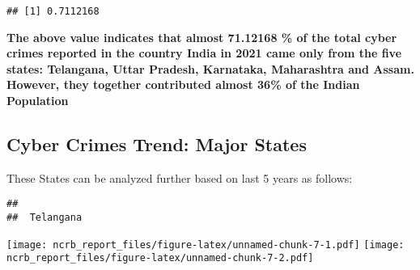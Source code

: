 \documentclass[
  12,
  a4paper,
]{report}
\newenvironment{Shaded}{\begin{snugshade}}{\end{snugshade}}
\newcommand{\ControlFlowTok}[1]{\textcolor[rgb]{0.13,0.29,0.53}{\textbf{#1}}}
\newcommand{\DecValTok}[1]{\textcolor[rgb]{0.00,0.00,0.81}{#1}}
\newcommand{\FunctionTok}[1]{\textcolor[rgb]{0.13,0.29,0.53}{\textbf{#1}}}
\newcommand{\NormalTok}[1]{#1}
\newcommand{\OtherTok}[1]{\textcolor[rgb]{0.56,0.35,0.01}{#1}}
\newcommand{\SpecialCharTok}[1]{\textcolor[rgb]{0.81,0.36,0.00}{\textbf{#1}}}
\newcommand{\StringTok}[1]{\textcolor[rgb]{0.31,0.60,0.02}{#1}}
\begin{document}
\begin{verbatim}
## [1] 0.7112168
\end{verbatim}

\textbf{The above value indicates that almost 71.12168 \% of the total
cyber crimes reported in the country India in 2021 came only from the
five states: Telangana, Uttar Pradesh, Karnataka, Maharashtra and Assam.
However, they together contributed almost 36\% of the Indian Population}

\hypertarget{cyber-crimes-trend-major-states}{%
\subsection{Cyber Crimes Trend: Major
States}\label{cyber-crimes-trend-major-states}}

These States can be analyzed further based on last 5 years as follows:

\begin{Shaded}
\end{Shaded}

\begin{verbatim}
## 
##  Telangana
\end{verbatim}

\texttt{[image: ncrb\_report\_files/figure-latex/unnamed-chunk-7-1.pdf]}
\texttt{[image: ncrb\_report\_files/figure-latex/unnamed-chunk-7-2.pdf]}
\end{document}
